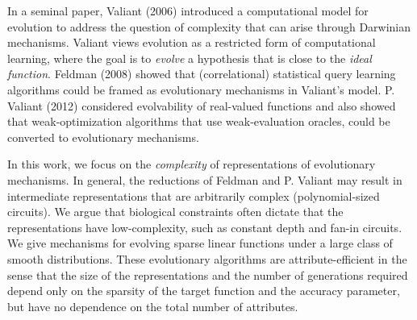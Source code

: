 In a seminal paper, Valiant (2006) introduced a computational model for
evolution to address the question of complexity that can arise through Darwinian
mechanisms. Valiant views evolution as a restricted form of computational
learning, where the goal is to \emph{evolve} a hypothesis that is close to the
\emph{ideal function}. Feldman (2008) showed that (correlational) statistical
query learning algorithms could be framed as evolutionary mechanisms in
Valiant's model. P. Valiant (2012) considered evolvability of real-valued
functions and also showed that weak-optimization algorithms that use
weak-evaluation oracles, could be converted to evolutionary mechanisms.

In this work, we focus on the \emph{complexity} of representations of
evolutionary mechanisms. In general, the reductions of Feldman and P. Valiant
may result in intermediate representations that are arbitrarily complex
(polynomial-sized circuits). We argue that biological constraints often dictate
that the representations have low-complexity, such as constant depth and fan-in
circuits. We give mechanisms for evolving sparse linear functions under a large
class of smooth distributions. These evolutionary algorithms are
attribute-efficient in the sense that the size of the representations and the
number of generations required depend only on the sparsity of the target
function and the accuracy parameter, but have no dependence on the total number of
attributes.
